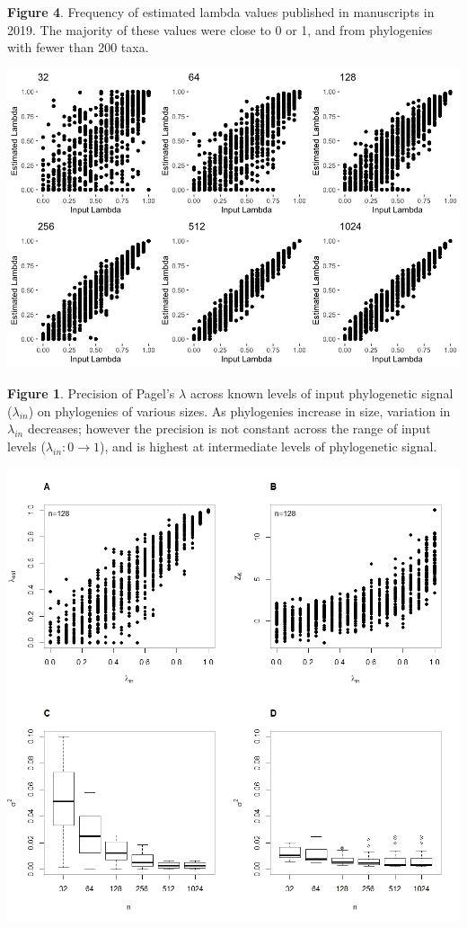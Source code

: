 \documentclass[
]{article}
\begin{document}
\textbf{Figure 4}. Frequency of estimated lambda values published in
manuscripts in 2019. The majority of these values were close to 0 or 1,
and from phylogenies with fewer than 200 taxa.

\newpage

\includegraphics[width=0.95\linewidth]{Fig1}

\singlespacing \textbf{Figure 1}. Precision of Pagel's \(\lambda\)
across known levels of input phylogenetic signal (\(\lambda_{in}\)) on
phylogenies of various sizes. As phylogenies increase in size, variation
in \(\lambda_{in}\) decreases; however the precision is not constant
across the range of input levels (\(\lambda_{in}: 0 \to 1\)), and is
highest at intermediate levels of phylogenetic signal.

\newpage

\includegraphics[width=0.95\linewidth]{Fig2}
\end{document}
